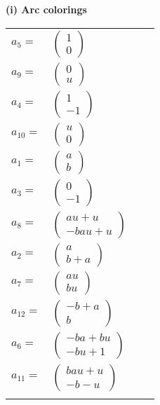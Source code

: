 \documentclass[1p]{elsarticle_modified}
\theoremstyle{definition}
\begin{document}
\flushleft \textbf{(i) Arc colorings}\\
\begin{tabular}{m{7pt} m{180pt} m{7pt} m{180pt} }
\flushright $a_{5}=$&$\begin{pmatrix}1\\0\end{pmatrix}$ \\
\flushright $a_{9}=$&$\begin{pmatrix}0\\u\end{pmatrix}$ \\
\flushright $a_{4}=$&$\begin{pmatrix}1\\-1\end{pmatrix}$ \\
\flushright $a_{10}=$&$\begin{pmatrix}u\\0\end{pmatrix}$ \\
\flushright $a_{1}=$&$\begin{pmatrix}a\\b\end{pmatrix}$ \\
\flushright $a_{3}=$&$\begin{pmatrix}0\\-1\end{pmatrix}$ \\
\flushright $a_{8}=$&$\begin{pmatrix}a u+u\\- b a u+u\end{pmatrix}$ \\
\flushright $a_{2}=$&$\begin{pmatrix}a\\b+a\end{pmatrix}$ \\
\flushright $a_{7}=$&$\begin{pmatrix}a u\\b u\end{pmatrix}$ \\
\flushright $a_{12}=$&$\begin{pmatrix}- b+a\\b\end{pmatrix}$ \\
\flushright $a_{6}=$&$\begin{pmatrix}- b a+b u\\- b u+1\end{pmatrix}$ \\
\flushright $a_{11}=$&$\begin{pmatrix}b a u+u\\- b- u\end{pmatrix}$\\&\end{tabular}
\end{document}
